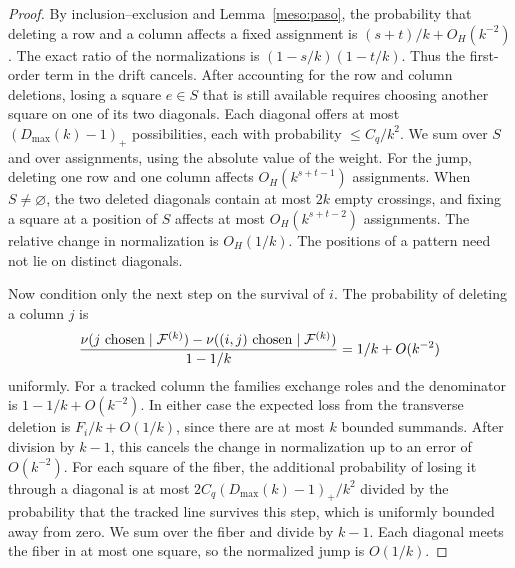 \begin{proof}
By inclusion--exclusion and Lemma~\ref{meso:paso}, the probability that deleting a row and a column
affects a fixed assignment is $(s+t)/k+O_H(k^{-2})$. The exact ratio of the normalizations is
$(1-s/k)(1-t/k)$. Thus the first-order term in the drift cancels. After accounting for the row and column
deletions, losing a square $e\in S$ that is still available requires choosing another square on one of its
two diagonals. Each diagonal offers at most $(D_{\max}(k)-1)_+$ possibilities, each with probability $\le
C_q/k^2$. We sum over $S$ and over assignments, using the absolute value of the weight. For the jump,
deleting one row and one column affects $O_H(k^{s+t-1})$ assignments. When $S\ne\varnothing$, the two
deleted diagonals contain at most $2k$ empty crossings, and fixing a square at a position of $S$ affects
at most $O_H(k^{s+t-2})$ assignments. The relative change in normalization is $O_H(1/k)$. The positions of
a pattern need not lie on distinct diagonals.

Now condition only the next step on the survival of $i$. The probability of deleting a column $j$ is
\[
 \frac{\nu(j\ {\rm chosen}\mid\mathcal F^{(k)})-
       \nu((i,j)\ {\rm chosen}\mid\mathcal F^{(k)})}{1-1/k}
   =1/k+O(k^{-2})
\]
uniformly. For a tracked column the families exchange roles and the denominator is $1-1/k+O(k^{-2})$. In
either case the expected loss from the transverse deletion is $F_i/k+O(1/k)$, since there are at most $k$
bounded summands. After division by $k-1$, this cancels the change in normalization up to an error of
$O(k^{-2})$. For each square of the fiber, the additional probability of losing it through a diagonal is
at most $2C_q(D_{\max}(k)-1)_+/k^2$ divided by the probability that the tracked line survives this step,
which is uniformly bounded away from zero. We sum over the fiber and divide by $k-1$. Each diagonal meets
the fiber in at most one square, so the normalized jump is $O(1/k)$.
\end{proof}
